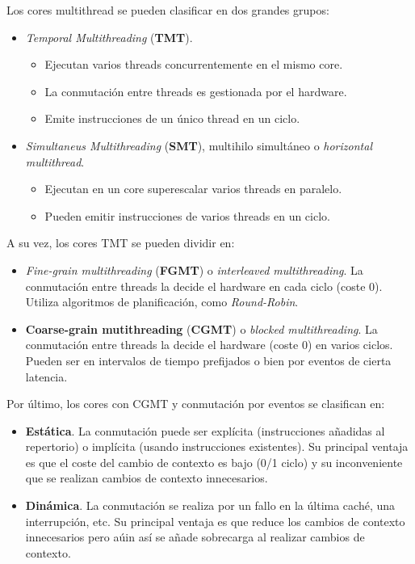\documentclass[12pt,spanish]{article}
\begin{document}
Los cores multithread se pueden clasificar en dos grandes grupos:

\begin{itemize}
	\item \textit{Temporal Multithreading} (\textbf{TMT}). 
	\begin{itemize}
		\item 	Ejecutan varios threads concurrentemente en el mismo core.
		\item La conmutación entre threads es gestionada por el hardware.
		\item Emite instrucciones de un único thread en un ciclo.
	\end{itemize}
	\item \textit{Simultaneus Multithreading} (\textbf{SMT}), multihilo simultáneo o \textit{horizontal multithread}.
		\begin{itemize}
			\item Ejecutan en un core superescalar varios threads en paralelo.
			\item Pueden emitir instrucciones de varios threads en un ciclo.
		\end{itemize}
\end{itemize}

A su vez, los cores TMT se pueden dividir en:

\begin{itemize}
	\item \textit{Fine-grain multithreading} (\textbf{FGMT}) o \textit{interleaved multithreading}.
	 La conmutación entre threads la decide el hardware en cada ciclo (coste 0). Utiliza algoritmos de planificación, como \textit{Round-Robin}.
	 \item \textbf{Coarse-grain mutithreading} (\textbf{CGMT}) o \textit{blocked multithreading}. La conmutación entre threads la decide el hardware (coste 0) en varios ciclos. Pueden ser en intervalos de tiempo prefijados o bien por eventos de cierta latencia.
\end{itemize}

Por último, los cores con CGMT y conmutación por eventos se clasifican en:

\begin{itemize}
	\item \textbf{Estática}. La conmutación puede ser explícita (instrucciones añadidas al repertorio) o implícita (usando instrucciones existentes). Su principal ventaja es que el coste del cambio de contexto es bajo (0/1 ciclo) y su inconveniente que se realizan cambios de contexto innecesarios.
	\item \textbf{Dinámica}. La conmutación se realiza por un fallo en la última caché, una interrupción, etc. Su principal ventaja es que reduce los cambios de contexto innecesarios pero aúin así se añade sobrecarga al realizar cambios de contexto.
\end{itemize}
\end{document}
